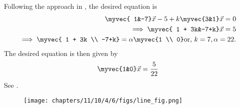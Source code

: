 		Following the approach in ,
		the desired equation is 
\begin{align}
\myvec{	1&-7}\vec{x} -5
+
	k\myvec{3&1} \vec{x} = 0
	\\
	\implies 
	\myvec{	1 + 3k&-7+k} 
	 \vec{x} =5 
	 \\
	 \implies 
	\myvec{	1 + 3k \\ -7+k}  = \alpha \myvec{1 \\ 0}
	\text{or, } k = 7, \alpha =  22.
\end{align}
The desired equation is then given by 
\begin{align}
	\myvec{1&0}\vec{x}=\frac{5}{22}
\end{align}
See  
.
\begin{figure}[H]
  \begin{center} 
      \texttt{[image: chapters/11/10/4/6/figs/line\_fig.png]}
  \end{center}
\caption{}
\label{fig:chapters/11/10/4/6/Fig3}
\end{figure}
